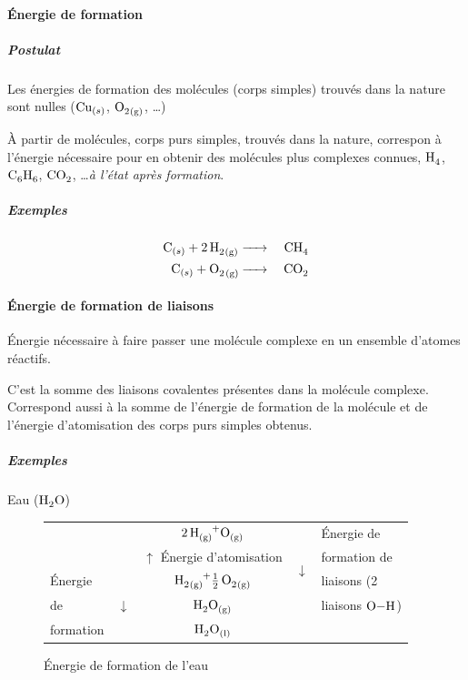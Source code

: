 \documentclass[11pt,a4paper,french]{article}
\newcommand\gaz{_{(g)}}
\newcommand\liquid{_{(l)}}
\begin{document}
\paragraph{\'Energie de formation}
\subparagraph{Postulat}
Les énergies de formation des molécules (corps simples) trouvés dans la nature sont nulles ($\ce{Cu}_{(s)}$, $\ce{O2\gaz}$, \ldots)

\`A partir de molécules, corps purs simples, trouvés dans la nature, correspon à l'énergie nécessaire pour en obtenir des molécules plus complexes connues, $\ce{H4}$, $\ce{C6H6}$, $\ce{CO2}$, \ldots {\it à l'état après formation}.

\subparagraph{Exemples}
\begin{eqnarray*}
	\ce{C}_{(s)} \ce{+ 2H2\gaz} & \ce{->} & \ce{CH4}\\ %
	\ce{C}_{(s)} \ce{+ O_2 \gaz} & \ce{->} & \ce{CO2} %
\end{eqnarray*}

\paragraph{\'Energie de formation de liaisons}
\'Energie nécessaire à faire passer une molécule complexe en un ensemble d'atomes réactifs.

C'est la somme des liaisons covalentes présentes dans la molécule complexe.
Correspond aussi à la somme de l'énergie de formation de la molécule et de l'énergie d'atomisation des corps purs simples obtenus.

\subparagraph{Exemples}
Eau ($\ce{H2O}$)
\begin{figure}[h!]
	\begin{center}
		\begin{tabular}{clc|cl|}
			\cline{4-5}
			& & $\ce{2H\gaz + O\gaz}$ & \multirow{4}{*}{$\downarrow$} & \'Energie de\\
			\cline{3-3}
			& & \multicolumn{1}{|c}{$\uparrow$ \'Energie d'atomisation} & & formation de\\
			\cline{1-3}
			\multicolumn{1}{|l}{\'Energie} & \multicolumn{1}{c|}{} & $\ce{H2\gaz + 1/2O2\gaz}$ & & liaisons (2\\
			\multicolumn{1}{|l}{de} & \multicolumn{1}{c|}{$\downarrow$} & $\ce{H2O\gaz}$ & & liaisons $\ce{O-H}$)\\
			\cline{4-5}
			\multicolumn{1}{|l}{formation} & \multicolumn{1}{c|}{} & \multicolumn{1}{c}{$\ce{H2O\liquid}$} & & \multicolumn{1}{l}{}\\
			\cline{1-2}
		\end{tabular}
	\end{center}
	\label{fig:form_eau}
	\caption{\'Energie de formation de l'eau}
\end{figure}
\end{document}
